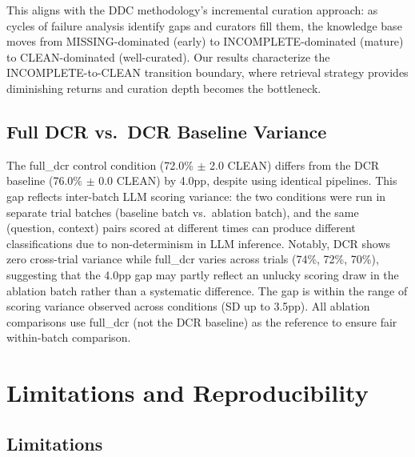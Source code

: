 \documentclass[11pt,a4paper]{article}
\begin{document}
This aligns with the DDC methodology's incremental curation approach: as cycles of failure analysis identify gaps and curators fill them, the knowledge base moves from MISSING-dominated (early) to INCOMPLETE-dominated (mature) to CLEAN-dominated (well-curated). Our results characterize the INCOMPLETE-to-CLEAN transition boundary, where retrieval strategy provides diminishing returns and curation depth becomes the bottleneck.

\subsection{Full DCR vs.\ DCR Baseline Variance}

The full\_dcr control condition (72.0\% $\pm$ 2.0 CLEAN) differs from the DCR baseline (76.0\% $\pm$ 0.0 CLEAN) by 4.0pp, despite using identical pipelines. This gap reflects inter-batch LLM scoring variance: the two conditions were run in separate trial batches (baseline batch vs.\ ablation batch), and the same (question, context) pairs scored at different times can produce different classifications due to non-determinism in LLM inference. Notably, DCR shows zero cross-trial variance while full\_dcr varies across trials (74\%, 72\%, 70\%), suggesting that the 4.0pp gap may partly reflect an unlucky scoring draw in the ablation batch rather than a systematic difference. The gap is within the range of scoring variance observed across conditions (SD up to 3.5pp). All ablation comparisons use full\_dcr (not the DCR baseline) as the reference to ensure fair within-batch comparison.

\section{Limitations and Reproducibility}
\label{sec:limitations}

\subsection{Limitations}
\end{document}

